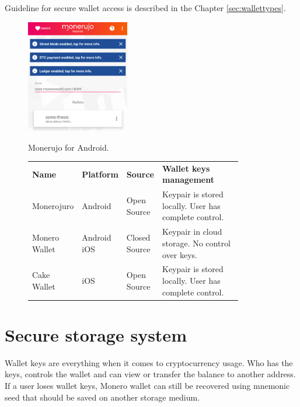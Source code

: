 \documentclass[
  printed, %
  table,   %
  lof,     %
  lot,     %
           oneside, color
]{fithesis3}
\begin{document}
Guideline for secure wallet access is described in the Chapter \ref{sec:wallettypes}. 

\begin{figure}[H]
\begin{center}
\vspace{-0.75em}
 \includegraphics[trim={0 1.8cm 0 0},clip,width=0.4\textwidth]{Screenshot_1542566492.png}
    \caption{Monerujo for Android.}
    \vspace{-1.5em}
    \label{pic:withoutresdrawable}
\end{center}
    \end{figure}
 \vspace{-0.9em}
\begin{figure}[H]
\centering\begin{tabular}{p{0.2\linewidth}p{0.15\linewidth}p{0.1\linewidth}p{0.4\linewidth}}
\textbf{Name}         & \textbf{Platform}      & \textbf{Source}        & \textbf{Wallet keys management} \\
Monerojuro    & Android       & Open Source   & Keypair is stored locally.  User has complete control.                      \\
Monero \linebreak Wallet & Android  iOS & Closed Source & Keypair in cloud storage. No control over keys. \\
Cake Wallet   & iOS           & Open Source   & Keypair is stored locally.  User has complete control.                           
\end{tabular}
\label{table:monero-mobile}
\end{figure}


\section{Secure storage system}
Wallet keys are everything when it comes to cryptocurrency usage. Who has the keys, controls the wallet and can view or transfer the balance to another address. If a user loses wallet keys, Monero wallet can still be recovered using mnemonic seed that should be saved on another storage medium. 
\end{document}
